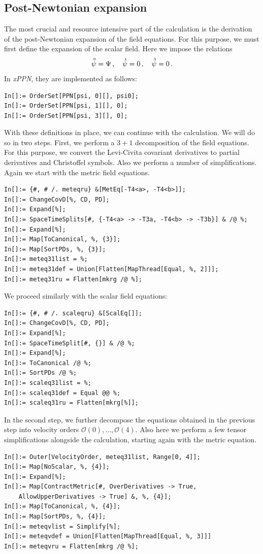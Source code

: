 \documentclass[notitlepage,a4paper,aps,prd,onecolumn,superscriptaddress,nofootinbib,groupedaddress,longbibliography]{revtex4-1}
\newcommand{\order}[2]{\accentset{#2}{#1}}
\newcommand{\xPPN}{\emph{xPPN}}
\begin{document}
\subsection{Post-Newtonian expansion}\label{ssec:ppnexp}
The most crucial and resource intensive part of the calculation is the derivation of the post-Newtonian expansion of the field equations. For this purpose, we must first define the expansion of the scalar field. Here we impose the relations
\begin{equation}
\order{\psi}{0} = \Psi\,, \quad
\order{\psi}{1} = 0\,, \quad
\order{\psi}{3} = 0\,.
\end{equation}
In \xPPN, they are implemented as follows:
\begin{lstlisting}
In[]:= OrderSet[PPN[psi, 0][], psi0];
In[]:= OrderSet[PPN[psi, 1][], 0];
In[]:= OrderSet[PPN[psi, 3][], 0];
\end{lstlisting}
With these definitions in place, we can continue with the calculation. We will do so in two steps. First, we perform a $3+1$ decomposition of the field equations. For this purpose, we convert the Levi-Civita covariant derivatives to partial derivatives and Christoffel symbols. Also we perform a number of simplifications. Again we start with the metric field equations.
\begin{lstlisting}
In[]:= {#, # /. meteqru} &[MetEq[-T4<a>, -T4<b>]];
In[]:= ChangeCovD[%, CD, PD];
In[]:= Expand[%];
In[]:= SpaceTimeSplits[#, {-T4<a> -> -T3a, -T4<b> -> -T3b}] & /@ %;
In[]:= Expand[%];
In[]:= Map[ToCanonical, %, {3}];
In[]:= Map[SortPDs, %, {3}];
In[]:= meteq31list = %;
In[]:= meteq31def = Union[Flatten[MapThread[Equal, %, 2]]];
In[]:= meteq31ru = Flatten[mkrg /@ %];
\end{lstlisting}
We proceed similarly with the scalar field equations:
\begin{lstlisting}
In[]:= {#, # /. scaleqru} &[ScalEq[]];
In[]:= ChangeCovD[%, CD, PD];
In[]:= Expand[%];
In[]:= SpaceTimeSplit[#, {}] & /@ %;
In[]:= Expand[%];
In[]:= ToCanonical /@ %;
In[]:= SortPDs /@ %;
In[]:= scaleq31list = %;
In[]:= scaleq31def = Equal @@ %;
In[]:= scaleq31ru = Flatten[mkrg[%]];
\end{lstlisting}
In the second step, we further decompose the equations obtained in the previous step into velocity orders \(\mathcal{O}(0), \ldots, \mathcal{O}(4)\). Also here we perform a few tensor simplifications alongside the calculation, starting again with the metric equation.
\begin{lstlisting}
In[]:= Outer[VelocityOrder, meteq31list, Range[0, 4]];
In[]:= Map[NoScalar, %, {4}];
In[]:= Expand[%];
In[]:= Map[ContractMetric[#, OverDerivatives -> True,
	AllowUpperDerivatives -> True] &, %, {4}];
In[]:= Map[ToCanonical, %, {4}];
In[]:= Map[SortPDs, %, {4}];
In[]:= meteqvlist = Simplify[%];
In[]:= meteqvdef = Union[Flatten[MapThread[Equal, %, 3]]]
In[]:= meteqvru = Flatten[mkrg /@ %];
\end{lstlisting}
\end{document}
